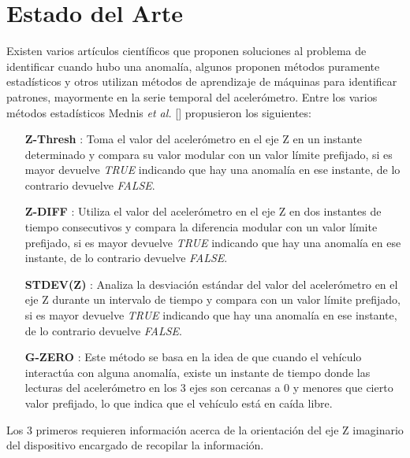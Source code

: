 \chapter{Estado del Arte}\label{chapter:state-of-the-art}

Existen varios artículos científicos que proponen soluciones al problema de identificar cuando hubo una anomalía, algunos proponen métodos puramente estadísticos y otros utilizan métodos de aprendizaje de máquinas para identificar patrones, mayormente en la serie temporal del acelerómetro. Entre los varios métodos estadísticos Mednis {\it et al.} [] propusieron los siguientes:\\

\begin{enumerate}
\item [ \textbf {Z-Thresh} ]: Toma el valor del acelerómetro en el eje Z en un instante determinado y compara su valor modular con un valor límite prefijado, si es mayor devuelve {\it TRUE} indicando que hay una anomalía en ese instante, de lo contrario devuelve {\it FALSE}.\\
	\item [ \textbf {Z-DIFF} ]: Utiliza el valor del acelerómetro en el eje Z en dos instantes de tiempo consecutivos y compara la diferencia modular con un valor límite prefijado, si es mayor devuelve {\it TRUE} indicando que hay una anomalía en ese instante, de lo contrario devuelve {\it FALSE}.\\
	\item [ \textbf {STDEV(Z)} ]: Analiza la desviación estándar del valor del acelerómetro en el eje Z durante un intervalo de tiempo y compara con un valor límite prefijado, si es mayor devuelve {\it TRUE} indicando que hay una anomalía en ese instante, de lo contrario devuelve {\it FALSE}.\\ 
	\item [ \textbf {G-ZERO} ]: Este método se basa en la idea de que cuando el vehículo interactúa con alguna anomalía, existe un instante de tiempo donde las lecturas del acelerómetro en los 3 ejes son cercanas a 0 y menores que cierto valor prefijado, lo que indica que el vehículo está en caída libre.\\
\end{enumerate}

Los 3 primeros requieren información acerca de la orientación del eje Z imaginario del dispositivo encargado de recopilar la información.\\

